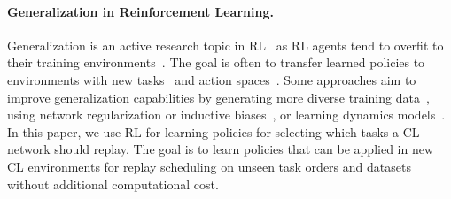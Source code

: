 \vspace{-3mm}
\paragraph{Generalization in Reinforcement Learning.} Generalization is an active research topic in RL~ as RL agents tend to overfit to their training environments~. The goal is often to transfer learned policies to environments with new tasks~ and action spaces~. Some approaches aim to improve generalization capabilities by generating more diverse training data~, using network regularization or inductive biases~, or learning dynamics models~. In this paper, we use RL for learning policies for selecting which tasks a CL network should replay. The goal is to learn policies that can be applied in new CL environments for replay scheduling on unseen task orders and datasets without additional computational cost. 




